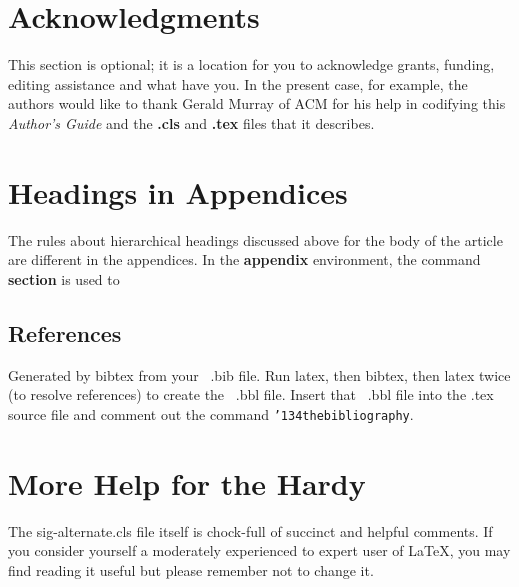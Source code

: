 \documentclass{sig-alternate}
\begin{document}
\section{Acknowledgments}
This section is optional; it is a location for you
to acknowledge grants, funding, editing assistance and
what have you.  In the present case, for example, the
authors would like to thank Gerald Murray of ACM for
his help in codifying this \textit{Author's Guide}
and the \textbf{.cls} and \textbf{.tex} files that it describes.

%

%
%
\appendix
\section{Headings in Appendices}
The rules about hierarchical headings discussed above for
the body of the article are different in the appendices.
In the \textbf{appendix} environment, the command
\textbf{section} is used to

\subsection{References}
Generated by bibtex from your ~.bib file.  Run latex,
then bibtex, then latex twice (to resolve references)
to create the ~.bbl file.  Insert that ~.bbl file into
the .tex source file and comment out
the command \texttt{{\char'134}thebibliography}.
\section{More Help for the Hardy}
The sig-alternate.cls file itself is chock-full of succinct
and helpful comments.  If you consider yourself a moderately
experienced to expert user of \LaTeX, you may find reading
it useful but please remember not to change it.
\end{document}
